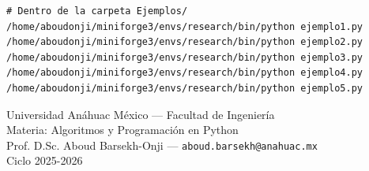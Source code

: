 \documentclass[12pt,a4paper]{article}
\begin{document}
\vspace{1em}
\begin{tcolorbox}[colback=anaDark!5,colframe=anaDark,
                  fonttitle=\bfseries,title={Para ejecutar los ejemplos}]
\begin{lstlisting}[style=PythonStyle,numbers=none,frame=none,backgroundcolor=\color{white}]
# Dentro de la carpeta Ejemplos/
/home/aboudonji/miniforge3/envs/research/bin/python ejemplo1.py
/home/aboudonji/miniforge3/envs/research/bin/python ejemplo2.py
/home/aboudonji/miniforge3/envs/research/bin/python ejemplo3.py
/home/aboudonji/miniforge3/envs/research/bin/python ejemplo4.py
/home/aboudonji/miniforge3/envs/research/bin/python ejemplo5.py
\end{lstlisting}
\end{tcolorbox}

\vspace{1.5em}
\begin{center}
  \small\color{gray}
  Universidad Anáhuac México — Facultad de Ingeniería\\
  Materia: Algoritmos y Programación en Python\\
  Prof. D.Sc. Aboud Barsekh-Onji — \texttt{aboud.barsekh@anahuac.mx}\\
  Ciclo 2025-2026
\end{center}
\end{document}
